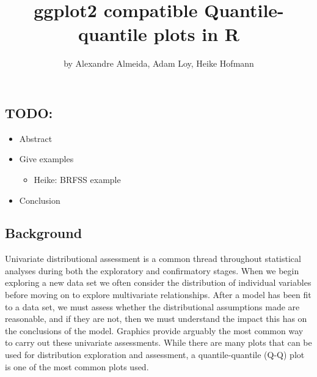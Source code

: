 \title{ggplot2 compatible Quantile-quantile plots in R}
\author{by Alexandre Almeida, Adam Loy, Heike Hofmann}

\maketitle


\newcommand{\hh}[1]{{\textcolor{orange}{#1}}}
\newcommand{\al}[1]{{\textcolor{violet}{#1}}}

\subsection{TODO:}\label{todo}

\begin{itemize}
\tightlist
\item
  Abstract
\item
  Give examples

  \begin{itemize}
  \tightlist
  \item
    Heike: BRFSS example
  \end{itemize}
\item
  Conclusion
\end{itemize}

\subsection{Background}\label{background}

\label{sec:introduction}

Univariate distributional assessment is a common thread throughout
statistical analyses during both the exploratory and confirmatory
stages. When we begin exploring a new data set we often consider the
distribution of individual variables before moving on to explore
multivariate relationships. After a model has been fit to a data set, we
must assess whether the distributional assumptions made are reasonable,
and if they are not, then we must understand the impact this has on the
conclusions of the model. Graphics provide arguably the most common way
to carry out these univariate assessments. While there are many plots
that can be used for distribution exploration and assessment, a
quantile-quantile (Q-Q) plot \citep{Wilk1968-ii} is one of the most
common plots used.


